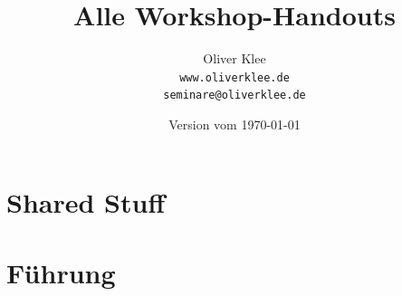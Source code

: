 \documentclass[a4paper,openany,twoside,titlepage,10pt,headsepline]{scrbook}
\title{Alle Workshop-Handouts}
\author{Oliver Klee\\\texttt{www.oliverklee.de}\\\texttt{seminare@oliverklee.de}}
\date{Version vom \today}
\begin{document}
    \frontmatter

    \maketitle

    \mainmatter

    \pagestyle{empty}


    \chapter{Shared Stuff}
    
    
    
    
    
    
    
    
    
    
    
    
    
    
    
    
    
    
    
    
    
    
    
    
    
    
    


    \chapter{Führung}
    
    
    
    
    
    
    
    
    
    
    
    
    
    
    
    
\end{document}
